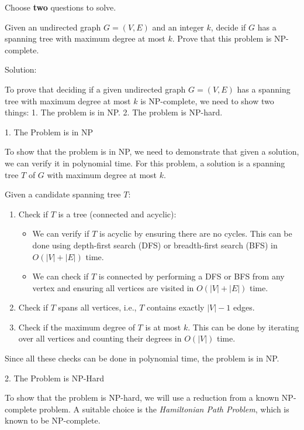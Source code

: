 \documentclass{oxmathproblems}
\begin{document}
Choose \textbf{two} questions to solve.

\begin{questions}
\miquestion[50] 
Given an undirected graph $G=(V,E)$ and an integer $k$, decide if $G$ has a spanning tree with maximum degree at most $k$. Prove that this problem is NP-complete.

Solution:

To prove that deciding if a given undirected graph \( G = (V, E) \) has a spanning tree with maximum degree at most \( k \) is NP-complete, we need to show two things:
1. The problem is in NP.
2. The problem is NP-hard.

1. The Problem is in NP

To show that the problem is in NP, we need to demonstrate that given a solution, we can verify it in polynomial time. For this problem, a solution is a spanning tree \( T \) of \( G \) with maximum degree at most \( k \).

Given a candidate spanning tree \( T \):
\begin{enumerate}
    \item Check if \( T \) is a tree (connected and acyclic):
    \begin{itemize}
        \item We can verify if \( T \) is acyclic by ensuring there are no cycles. This can be done using depth-first search (DFS) or breadth-first search (BFS) in \( O(|V| + |E|) \) time.
        \item We can check if \( T \) is connected by performing a DFS or BFS from any vertex and ensuring all vertices are visited in \( O(|V| + |E|) \) time.
    \end{itemize}
    \item Check if \( T \) spans all vertices, i.e., \( T \) contains exactly \( |V| - 1 \) edges.
    \item Check if the maximum degree of \( T \) is at most \( k \). This can be done by iterating over all vertices and counting their degrees in \( O(|V|) \) time.
\end{enumerate}

Since all these checks can be done in polynomial time, the problem is in NP.

2. The Problem is NP-Hard

To show that the problem is NP-hard, we will use a reduction from a known NP-complete problem. A suitable choice is the \textit{Hamiltonian Path Problem}, which is known to be NP-complete.


\end{questions}
\end{document}
